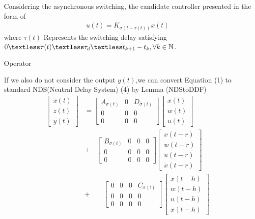 \documentclass[twocolumn]{autart}    %
\begin{document}
Considering the asynchronous switching, the candidate controller presented in the form of 
\begin{equation} \label{e1}
    \begin{aligned}
        u(t) = K_{\sigma(t-\tau(t))}x(t)
    \end{aligned}
\end{equation}
where $\tau(t)$ Represents the switching delay satisfying $0 \textless \tau(t) \textless \tau_{d} \textless t_{k+1}-t_{k},\forall k \in \mathbb{N} $.

Operator




If we also do not consider the output $y(t)$,we can convert Equation (1) to standard NDS(Neutral Delay System) (4) by Lemma (NDStoDDF)
\begin{equation}
    \begin{aligned}
        \begin{bmatrix}
            \dot{x}(t) \\
            z(t) \\
            y(t) 
        \end{bmatrix} &=\begin{bmatrix}
            A_{\sigma(t)} & 0 & D_{\sigma(t)}\\
            0 & 0 & 0\\
            0 & 0 & 0
        \end{bmatrix}\begin{bmatrix}
            x(t) \\
            w(t) \\
            u(t) 
        \end{bmatrix} \\ 
        &+ \quad \begin{bmatrix}
            B_{\sigma(t)} & 0 & 0 & 0\\
            0 & 0 & 0 & 0\\
            0 & 0 & 0 & 0
        \end{bmatrix} \begin{bmatrix}
            x(t-r) \\
            w(t-r) \\
            u(t-r) \\
            \dot{x}(t-r)
        \end{bmatrix} \\
        &+ \qquad \begin{bmatrix}
            0 & 0 & 0 & C_{\sigma(t)}\\
            0 & 0 & 0 & 0\\
            0 & 0 & 0 & 0
        \end{bmatrix} \begin{bmatrix}
            x(t-h) \\
            w(t-h) \\
            u(t-h) \\
            \dot{x}(t-h)
        \end{bmatrix}
    \end{aligned}
\end{equation}
\end{document}
